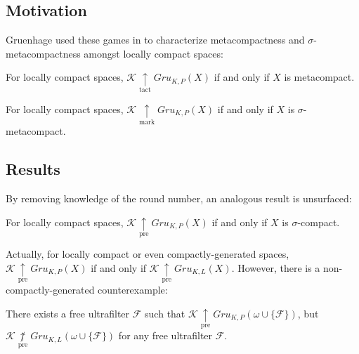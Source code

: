 \documentclass{beamer}
\theoremstyle{definition}
\newcommand{\prewin}{\underset{\text{pre}}{\uparrow}}
\newcommand{\markwin}{\underset{\text{mark}}{\uparrow}}
\newcommand{\tactwin}{\underset{\text{tact}}{\uparrow}}
\newcommand{\notprewin}{\underset{\text{pre}}{\not\uparrow}}
\newcommand{\gruKPGame}[1]{Gru_{K,P}\left({#1}\right)}
\newcommand{\gruKLGame}[1]{Gru_{K,L}\left({#1}\right)}
\newcommand{\<}{\langle}
\renewcommand{\>}{\rangle}
\newcommand{\mc}[1]{\mathcal{#1}}
\newcommand{\pl}[1]{\mathscr{#1}}
\begin{document}
\subsection{Motivation}

\begin{frame}
  Gruenhage used these games in \cite{MR752278} to characterize
  metacompactness and $\sigma$-metacompactness amongst locally compact
  spaces:

  \begin{theorem}
    For locally compact spaces, $\pl K\tactwin\gruKPGame{X}$ if and only if
    $X$ is metacompact.
  \end{theorem}

  \begin{theorem}
    For locally compact spaces, $\pl K\markwin\gruKPGame{X}$ if and only if
    $X$ is $\sigma$-metacompact.
  \end{theorem}
\end{frame}

\subsection{Results}

\begin{frame}
  By removing knowledge of the round number, an analogous result is
  unsurfaced:

  \begin{theorem}
    For locally compact spaces, $\pl K\prewin\gruKPGame{X}$ if and only if
    $X$ is $\sigma$-compact.
  \end{theorem}

  \pause

  Actually, for locally compact or even compactly-generated spaces,
  $\pl K\prewin\gruKPGame{X}$ if and only if $\pl K\prewin\gruKLGame{X}$.
  However, there is a non-compactly-generated counterexample:

  \begin{theorem}
    There exists a free ultrafilter $\mc F$ such that
    $\pl K \prewin\gruKPGame{\omega\cup\{\mc F\}}$, but
    $\pl K \notprewin\gruKLGame{\omega\cup\{\mc F\}}$ for any free
    ultrafilter $\mc F$.
  \end{theorem}
\end{frame}
\end{document}
